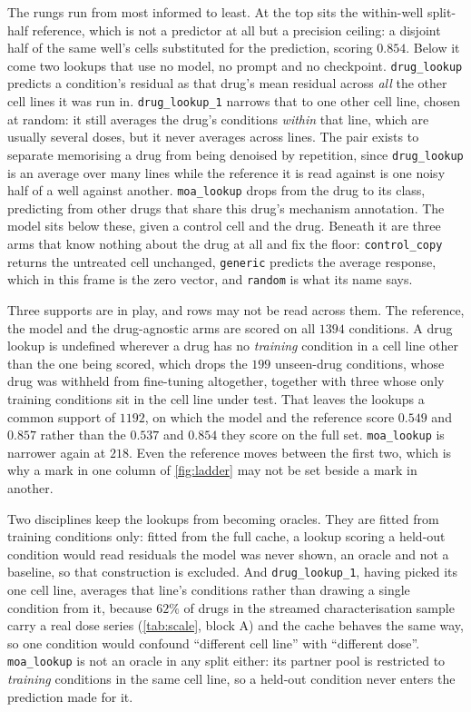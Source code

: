 The rungs run from most informed to least. At the top sits the within-well
split-half reference, which is not a predictor at all but a precision ceiling: a
disjoint half of the same well's cells substituted for the prediction, scoring
$0.854$. Below it come two lookups that use no model, no prompt and no checkpoint.
\texttt{drug\_lookup} predicts a condition's residual as that drug's mean residual
across \emph{all} the other cell lines it was run in. \texttt{drug\_lookup\_1}
narrows that to one other cell line, chosen at random: it still averages the
drug's conditions \emph{within} that line, which are usually several doses, but it
never averages across lines. The pair exists to separate memorising a drug from
being denoised by repetition, since \texttt{drug\_lookup} is an average over many
lines while the reference it is read against is one noisy half of a well against
another. \texttt{moa\_lookup} drops
from the drug to its class, predicting from other drugs that share this drug's
mechanism annotation. The model sits below these, given a control cell and the
drug. Beneath it are three arms that know nothing about the drug at all and fix
the floor: \texttt{control\_copy} returns the untreated cell unchanged,
\texttt{generic} predicts the average response, which in this frame is the zero
vector, and \texttt{random} is what its name says.

Three supports are in play, and rows may not be read across them. The reference,
the model and the drug-agnostic arms are scored on all $\num{1394}$ conditions.
A drug lookup is undefined wherever a drug has no
\emph{training} condition in a cell line other than the one being scored, which
drops the $\num{199}$ unseen-drug conditions, whose drug was withheld from
fine-tuning altogether, together with three whose only training conditions sit in
the cell line under test. That leaves the lookups a common support of
$\num{1192}$, on which the model and the reference score $0.549$ and $0.857$
rather than the $0.537$ and $0.854$ they score on the full set.
\texttt{moa\_lookup} is narrower again at $\num{218}$. Even
the reference moves between the first two, which is why a mark in one column of
\cref{fig:ladder} may not be set beside a mark in another.

Two disciplines keep the lookups from becoming oracles. They are fitted from
training conditions only: fitted from the full cache, a lookup scoring a held-out
condition would read residuals the model was never shown, an oracle and not a
baseline, so that construction is excluded. And \texttt{drug\_lookup\_1}, having
picked its one cell line, averages that line's conditions rather than drawing a
single condition from it, because $62\%$ of drugs in the streamed characterisation sample carry a real dose series (\cref{tab:scale}, block A) and the cache behaves the same way, so one condition would confound ``different cell line'' with ``different dose''. \texttt{moa\_lookup} is not an oracle in any split either: its
partner pool is restricted to \emph{training} conditions in the same cell line, so
a held-out condition never enters the prediction made for it.

